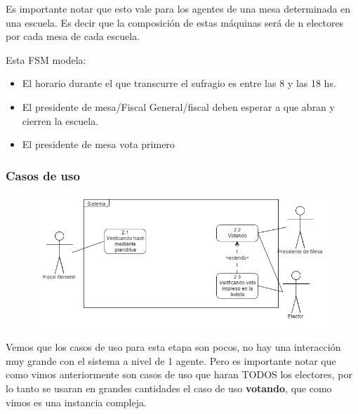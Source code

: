 Es importante notar que esto vale para los agentes de una mesa determinada en una escuela. Es decir que la composición de estas máquinas será de n electores por cada mesa de cada escuela.


Esta FSM modela:
\begin{itemize}
\item El horario durante el que transcurre el sufragio es entre las 8 y las 18 hs.
\item El presidente de mesa/Fiscal General/fiscal deben esperar a que abran y cierren la escuela.
\item El presidente de mesa vota primero

\end{itemize}

\newpage

\subsubsection{Casos de uso}

\begin{figure}[h!]
  \begin{center}
    \includegraphics[scale=0.45]{imagenes/CU/casosdeusosufragio.png}
  \end{center}
\end{figure}

Vemos que los casos de uso para esta etapa son pocos, no hay una interacción muy grande con el sistema a nivel de 1 agente. Pero es importante notar que como vimos anteriormente son casos de uso que haran TODOS los electores, por lo tanto se usaran en grandes cantidades el caso de uso \textbf{votando}, que como vimos es una instancia compleja.

